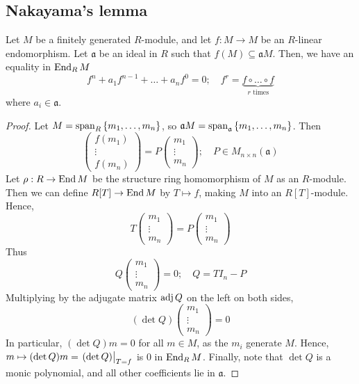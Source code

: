 \subsection{Nakayama's lemma}
\begin{proposition}
    Let \( M \) be a finitely generated \( R \)-module, and let \( f : M \to M \) be an \( R \)-linear endomorphism.
    Let \( \mathfrak a \) be an ideal in \( R \) such that \( f(M) \subseteq \mathfrak a M \).
    Then, we have an equality in \( \operatorname{End}_R M \)
    \[ f^n + a_1 f^{n-1} + \dots + a_n f^0 = 0;\quad f^r = \underbrace{f \circ \dots \circ f}_{r \text{ times}} \]
    where \( a_i \in \mathfrak a \).
\end{proposition}
\begin{proof}
    Let \( M = \operatorname{span}_R\qty{m_1, \dots, m_n} \), so \( \mathfrak a M = \operatorname{span}_{\mathfrak a} \qty{m_1, \dots, m_n} \).
    Then
    \[ \begin{pmatrix}
        f(m_1) \\
        \vdots \\
        f(m_n)
    \end{pmatrix} = P \begin{pmatrix}
        m_1 \\
        \vdots \\
        m_n
    \end{pmatrix};\quad P \in M_{n \times n}(\mathfrak a) \]
    Let \( \rho : R \to \operatorname{End} M \) be the structure ring homomorphism of \( M \) as an \( R \)-module.
    Then we can define \( R[T] \to \operatorname{End} M \) by \( T \mapsto f \), making \( M \) into an \( R[T] \)-module.
    Hence,
    \[ T \begin{pmatrix}
        m_1 \\
        \vdots \\
        m_n
    \end{pmatrix} = P \begin{pmatrix}
        m_1 \\
        \vdots \\
        m_n
    \end{pmatrix} \]
    Thus
    \[ Q \begin{pmatrix}
        m_1 \\
        \vdots \\
        m_n
    \end{pmatrix} = 0;\quad Q = T I_n - P \]
    Multiplying by the adjugate matrix \( \operatorname{adj} Q \) on the left on both sides,
    \[ (\det Q) \begin{pmatrix}
        m_1 \\
        \vdots \\
        m_n
    \end{pmatrix} = 0 \]
    In particular, \( (\det Q) m = 0 \) for all \( m \in M \), as the \( m_i \) generate \( M \).
    Hence, \( m \mapsto (\det Q) m = \eval{(\det Q)}_{T = f} \) is \( 0 \) in \( \operatorname{End}_R M \).
    Finally, note that \( \det Q \) is a monic polynomial, and all other coefficients lie in \( \mathfrak a \).
\end{proof}
